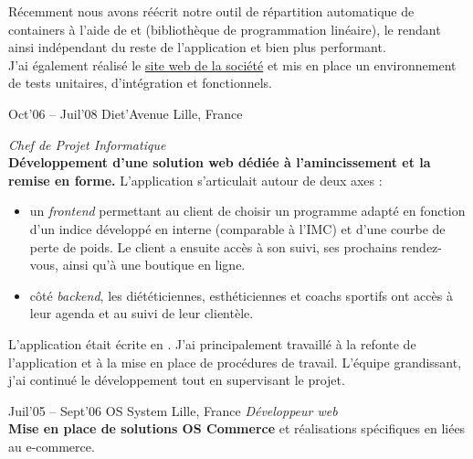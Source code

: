 \documentclass[]{cv} %
\begin{document}
\begin{entrylist}
{Récemment nous avons réécrit notre outil de répartition automatique de containers à l'aide de  et  (bibliothèque de programmation linéaire), le rendant ainsi indépendant du reste de l'application et bien plus performant.
\vspace{5pt}\\
J'ai également réalisé le \href{http://www.geniustrade.com}{site web de la société} et mis en place un environnement de tests unitaires, d'intégration et fonctionnels.
}
\end{entrylist}

\begin{entrylist}
\entry
{Oct'06 – Juil'08}
{Diet'Avenue}
{Lille, France}
{\emph{Chef de Projet Informatique}
\vspace{5pt}\\
\textbf{Développement d'une solution web dédiée à l'amincissement et la remise en forme.} L'application s'articulait autour de deux axes :
\begin{itemize}
\item un \emph{frontend} permettant au client de choisir un programme adapté en fonction d'un indice développé en interne (comparable à l'IMC) et d'une courbe de perte de poids. Le client a ensuite accès à son suivi, ses prochains rendez-vous, ainsi qu'à une boutique en ligne.
\item côté \emph{backend}, les diététiciennes, esthéticiennes et coachs sportifs ont accès à leur agenda et au suivi de leur clientèle. 
\end{itemize}
\vspace{5pt}
L'application était écrite en . J'ai principalement travaillé à la refonte de l'application et à la mise en place de procédures de travail. L'équipe grandissant, j'ai continué le développement tout en supervisant le projet.
}
\entry
{Juil'05 – Sept'06}
{OS System}
{Lille, France}
{\emph{Développeur web}
\vspace{5pt}\\
\textbf{Mise en place de solutions OS Commerce} et réalisations spécifiques en  liées au e-commerce.}
\end{entrylist}

\par\vspace{5\parskip}
\end{document}
